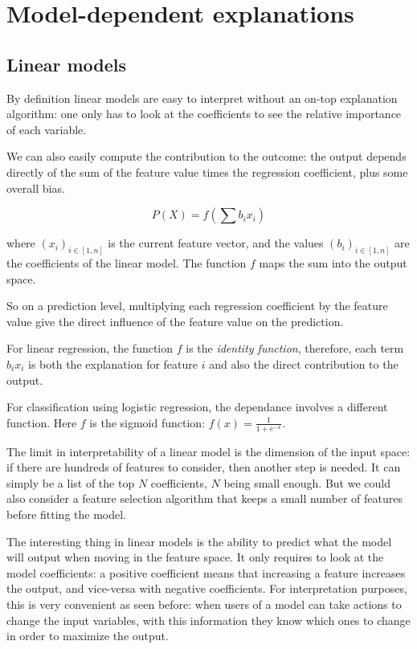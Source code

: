 \documentclass[a4paper,11pt]{kth-mag}
\begin{document}
\section{Model-dependent explanations}

\subsection{Linear models}

By definition linear models are easy to interpret without an on-top explanation algorithm: one only has to look at the coefficients to see the relative importance of each variable.

We can also easily compute the contribution to the outcome: the output depends directly of the sum of the feature value times the regression 	coefficient, plus some overall bias.

\[
	P(X) = f \left( \sum b_i x_i \right)
\]

where $(x_i)_{i \in [1, n]}$ is the current feature vector, and the values $(b_i)_{i \in [1, n]}$ are the coefficients of the linear model. The function $f$ maps the sum into the output space.

So on a prediction level, multiplying each regression coefficient by the feature value give the direct influence of the feature value on the prediction.

For linear regression, the function $f$ is the \textit{identity function}, therefore, each term $b_i x_i$ is both the explanation for feature $i$ and also the direct contribution to the output.

For classification using logistic regression, the dependance involves a different function. Here $f$ is the sigmoid function: $f(x) = \frac1{1 + e^{-x}}$.

The limit in interpretability of a linear model is the dimension of the input space: if there are hundreds of features to consider, then another step is needed. It can simply be a list of the top $N$ coefficients, $N$ being small enough. But we could also consider a feature selection algorithm that keeps a small number of features before fitting the model.

The interesting thing in linear models is the ability to predict what the model will output when moving in the feature space. It only requires to look at the model coefficients: a positive coefficient means that increasing a feature increases the output, and vice-versa with negative coefficients. For interpretation purposes, this is very convenient as seen before: when users of a model can take actions to change the input variables, with this information they know which ones to change in order to maximize the output.


\nocite{mythos}
\nocite{euregulation}
\nocite{healthcare}
\nocite{trust}
\nocite{explainingclassif}
\nocite{evolutionnary}
\nocite{breastcancer}
\nocite{sensitivity}

\printbibliography
\end{document}
